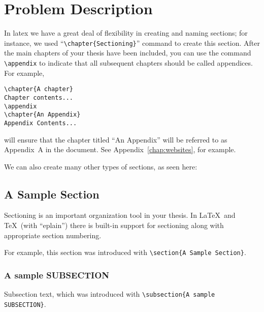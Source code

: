 \chapter{Problem Description}
\label{chap:PROBLEM}

In latex we have a great deal of flexibility in creating and naming
sections; for instance, we used ``\verb|\chapter{Sectioning}|''
command to create this section. After the main chapters of your
thesis have been included, you can use the command 
\verb|\appendix| to indicate that all subsequent chapters should 
be called appendices.  For example,

\begin{verbatim}
\chapter{A chapter}
Chapter contents...
\appendix
\chapter{An Appendix}
Appendix Contents...
\end{verbatim}

\noindent will ensure that the chapter titled ``An Appendix''
will be referred to as Appendix~A in the document.  See
Appendix~\ref{chap:websites}, for example.

We can also create many other types of sections, as seen here:

\section{A Sample Section}
\label{sec:ONE}

Sectioning is an important organization tool in your thesis.
In \LaTeX\ and \TeX\ (with ``eplain'') there is built-in support for
sectioning along with appropriate section numbering. 

For example, this section was introduced with 
\verb|\section{A Sample Section}|.

\subsection{A sample SUBSECTION}
\label{sec:TWO}
Subsection text, which was introduced with 
\verb|\subsection{A sample SUBSECTION}|.

